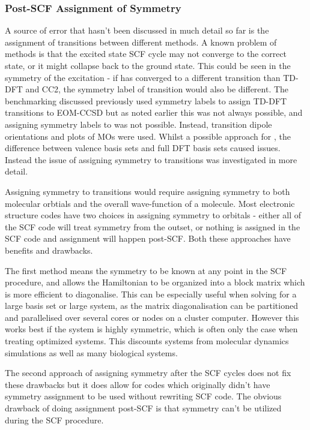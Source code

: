 \subsubsection{Post-SCF Assignment of Symmetry}
\label{subsubsec:post_scf_symmetry}

A source of error that hasn't been discussed in much detail so far is the assignment
of transitions between different methods. A known problem of \dscf methods is that
the excited state SCF cycle may not converge to the correct state, or it might
collapse back to the ground state. This could be seen in the symmetry of the excitation
- if \dscf has converged to a different transition than TD-DFT and CC2, the symmetry 
label of transition would also be different. The benchmarking discussed previously
used symmetry labels to assign TD-DFT transitions to EOM-CCSD but as noted earlier
this was not always possible, and assigning symmetry labels to \dscf was not possible.
Instead, transition dipole orientations and plots of MOs were used. Whilst a possible
approach for \dxtb, the difference between \dxtb valence basis sets and full DFT
basis sets caused issues. Instead the issue of assigning symmetry to \dscf transitions
was investigated in more detail.

Assigning symmetry to \dscf transitions would require assigning symmetry to both
molecular orbtials and the overall wave-function of a molecule. Most electronic 
structure codes have two choices in assigning symmetry to orbitals - either all
of the SCF code will treat symmetry from the outset, or nothing is assigned in the
SCF code and assignment will happen post-SCF. Both these approaches have benefits
and drawbacks.

The first method means the symmetry to be known at any point in the SCF procedure,
and allows the Hamiltonian to be organized into a block matrix which is more efficient
to diagonalise. This can be especially useful when solving for a large basis set 
or large system, as the matrix diagonalisation can be partitioned and parallelised 
over several cores or nodes on a cluster computer. However this works best if the
system is highly symmetric, which is often only the case when treating optimized 
systems. This discounts systems from molecular dynamics simulations as well as many
biological systems.

The second approach of assigning symmetry after the SCF cycles does not fix these
drawbacks but it does allow for codes which originally didn't have symmetry assignment
to be used without rewriting SCF code. The obvious drawback of doing assignment 
post-SCF is that symmetry can't be utilized during the SCF procedure.

